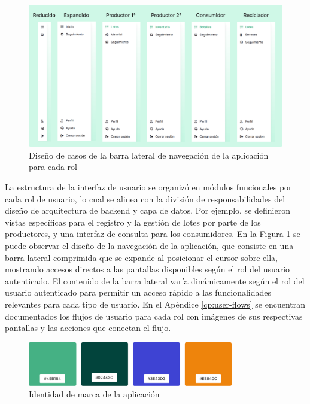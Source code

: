 \begin{figure}[!tb]
    \centering
    \includegraphics[width=\textwidth]{Figures/frontend-navigation.png}
    \caption{Diseño de casos de la barra lateral de navegación de la aplicación para cada rol}
    \label{fig:frontend-navigation}
\end{figure}

La estructura de la interfaz de usuario se organizó en módulos funcionales por cada rol de usuario, lo cual se alinea con la división de responsabilidades del diseño de arquitectura de backend y capa de datos. Por ejemplo, se definieron vistas específicas para el registro y la gestión de lotes por parte de los productores, y una interfaz de consulta para los consumidores. En la Figura \ref{fig:frontend-navigation} se puede observar el diseño de la navegación de la aplicación, que consiste en una barra lateral comprimida que se expande al posicionar el cursor sobre ella, mostrando accesos directos a las pantallas disponibles según el rol del usuario autenticado. El contenido de la barra lateral varía dinámicamente según el rol del usuario autenticado para permitir un acceso rápido a las funcionalidades relevantes para cada tipo de usuario. En el Apéndice \ref{cp:user-flows} se encuentran documentados los flujos de usuario para cada rol con imágenes de sus respectivas pantallas y las acciones que conectan el flujo.

\begin{figure}[!htb]
    \centering
    \includegraphics[width=0.8\textwidth]{Figures/frontend-palette.png}
    \caption{Identidad de marca de la aplicación}
    \label{fig:frontend-brand}
\end{figure}

